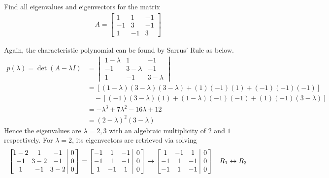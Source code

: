 \begin{exmp}
\label{exmp:2geomul}
Find all eigenvalues and eigenvectors for the matrix
\begin{align*}
A = \begin{bmatrix}
1 & 1 & -1 \\
-1 & 3 & -1 \\
1 & -1 & 3
\end{bmatrix}
\end{align*}
\end{exmp}
\begin{solution}
Again, the characteristic polynomial can be found by Sarrus' Rule as below.
\begin{align*}
p(\lambda) = \det(A-\lambda I) &= \begin{vmatrix}
1-\lambda & 1 & -1 \\
-1 & 3-\lambda & -1 \\
1 & -1 & 3-\lambda
\end{vmatrix} \\
&= [(1-\lambda)(3-\lambda)(3-\lambda) + (1)(-1)(1) + (-1)(-1)(-1)] \\
&\quad - [(-1)(3-\lambda)(1) + (1-\lambda)(-1)(-1) + (1)(-1)(3-\lambda)]\\
&= -\lambda^3 + 7\lambda^2 - 16\lambda + 12 \\
&= (2-\lambda)^2(3-\lambda)
\end{align*}
Hence the eigenvalues are $\lambda = 2,3$ with an algebraic multiplicity of $2$ and $1$ respectively. For $\lambda = 2$, its eigenvectors are retrieved via solving
\begin{align*}
\left[\begin{array}{@{\,}wc{17pt}wc{17pt}wc{17pt}|c@{\,}}
1-2 & 1 & -1 & 0 \\
-1 & 3-2 & -1 & 0 \\
1 & -1 & 3-2 & 0
\end{array}\right]
=
\left[\begin{array}{@{\,}wc{10pt}wc{10pt}wc{10pt}|c@{\,}}
-1 & 1 & -1 & 0 \\
-1 & 1 & -1 & 0 \\
1 & -1 & 1 & 0
\end{array}\right] 
&\to
\left[\begin{array}{@{\,}wc{10pt}wc{10pt}wc{10pt}|c@{\,}}
1 & -1 & 1 & 0 \\
-1 & 1 & -1 & 0 \\
-1 & 1 & -1 & 0 
\end{array}\right] & R_1 \leftrightarrow R_3 \\

\end{align*}
\end{solution}
